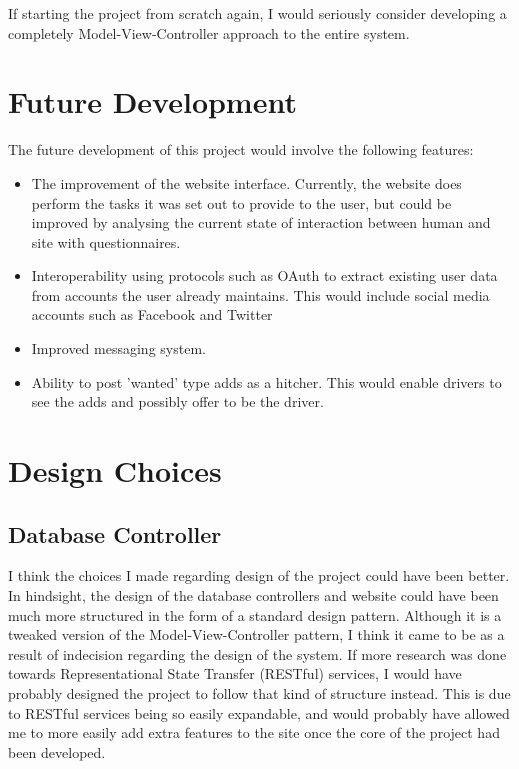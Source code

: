 If starting the project from scratch again, I would seriously consider developing a completely Model-View-Controller approach to the entire system.

\section{Future Development}
The future development of this project would involve the following features:

\begin{itemize}
\item The improvement of the website interface. Currently, the website does perform the tasks it was set out to provide to the user, but could be improved by analysing the current state of interaction between human and site with questionnaires.
\item Interoperability using protocols such as OAuth to extract existing user data from accounts the user already maintains. This would include social media accounts such as Facebook\cite{facebook} and Twitter\cite{twitter}
\item Improved messaging system.
\item Ability to post 'wanted' type adds as a hitcher. This would enable drivers to see the adds and possibly offer to be the driver.
\end{itemize}

\section{Design Choices}
\subsection{Database Controller}
I think the choices I made regarding design of the project could have been better. In hindsight, the design of the database controllers and website could have been much more structured in the form of a standard design pattern. Although it is a tweaked version of the Model-View-Controller pattern, I think it came to be as a result of indecision regarding the design of the system. If more research was done towards Representational State Transfer (RESTful) services, I would have probably designed the project to follow that kind of structure instead. This is due to RESTful services being so easily expandable, and would probably have allowed me to more easily add extra features to the site once the core of the project had been developed.

